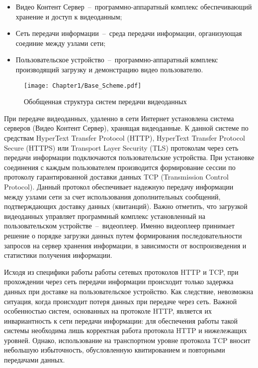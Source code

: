 \begin{itemize}
  \item Видео Контент Сервер~--~программно-аппаратный комплекс обеспечивающий хранение и доступ к видеоданным;
  \item Сеть передачи информации~--~среда передачи информации, организующая соединие между узлами сети;
  \item Пользовательское устройство~--~программно-аппаратный комплекс производящий загрузку и демонстрацию видео пользователю.
\end{itemize}

\begin{figure}[htbp]
\begin{center}
\texttt{[image: Chapter1/Base\_Scheme.pdf]}
\caption{Обобщенная структура систем передачи видеоданных}
\label{fig:Base_Scheme}
\end{center}
\end{figure}

При передаче видеоданных, удаленно в сети Интернет установлена система серверов (Видео Контент Сервер), хранящая видеоданные. К данной системе по средствам HyperText Transfer Protocol (HTTP), HyperText Transfer Protocol Secure (HTTPS) или Transport Layer Security (TLS) протоколам через сеть передачи информации подключаются пользовательские устройства. При установке соединения с каждым пользователем производится формирование сессии по протоколу гарантированной доставки данных TCP (Transmission Control Protocol). Данный протокол обеспечивает надежную передачу информации между узлами сети за счет использования дополнительных сообщений, подтверждающих доставку данных (квитанций). Важно отметить, что загрузкой видеоданных управляет программный комплекс установленный на пользовательском устройстве~--~видеоплеер. Именно видеоплеер принимает решение о порядке загрузки данных путем формирования последовательности запросов на сервер хранения информации, в зависимости от воспроизведения и статистики получения информации.

Исходя из специфики работы работы сетевых протоколов HTTP и TCP, при прохождении через сеть передачи информации происходит только задержка данных при доставке на пользовательское устройство. Как следствие, невозможна ситуация, когда происходит потеря данных при передаче через сеть. Важной особенностью систем, основанных на протоколе HTTP, является их инвариантность к сети передачи информации: для обеспечения работы такой системы необходима лишь корректная работа протокола HTTP и нижележащих уровней. Однако, использование на транспортном уровне протокола TCP вносит небольшую избыточность, обусловленную квитированием и повторными передачами данных.

